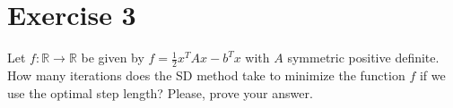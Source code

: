 \documentclass[unicode,11pt,a4paper,oneside,numbers=endperiod,openany]{scrartcl}
\newcommand{\myex}[1]{\begin{equation*}\begin{aligned} #1 \end{aligned}\end{equation*}}
\begin{document}





\section*{Exercise 3}
Let 
$f : \mathbb{R} \rightarrow \mathbb{R}$ 
be given by 
$f = \frac{1}{2} x^T Ax - b^T x$ 
with $A$ symmetric positive definite. 
How many iterations does the SD method take to minimize the function $f$ 
if we use the optimal step length? 
Please, prove your answer.



\end{document}
